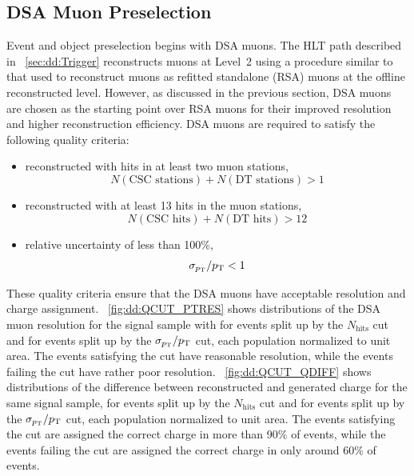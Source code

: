 \subsection{DSA Muon Preselection}
\label{sec:dd:DSAQuality}
Event and object preselection begins with DSA muons.
The HLT path described in \Sec~\ref{sec:dd:Trigger} reconstructs muons at Level~2 using a procedure similar to that used to reconstruct muons as refitted standalone (RSA) muons at the offline reconstructed level.
However, as discussed in the previous section, DSA muons are chosen as the starting point over RSA muons for their improved \pT resolution and higher reconstruction efficiency.
DSA muons are required to satisfy the following quality criteria:
\begin{itemize}
  \item reconstructed with hits in at least two muon stations, \ie $$N(\text{CSC stations}) + N(\text{DT stations}) > 1$$
  \item reconstructed with at least 13 hits in the muon stations, \ie $$N(\text{CSC hits}) + N(\text{DT hits}) > 12$$
  \item relative \pT uncertainty of less than 100\%, \ie $$\sigma_{p_{\mathrm{T}}}/p_{\mathrm{T}} < 1$$
\end{itemize}

These quality criteria ensure that the DSA muons have acceptable \pT resolution and charge assignment.
\Fig~\ref{fig:dd:QCUT_PTRES} shows distributions of the DSA muon \pT resolution for the \twoMu signal sample with  for events split up by the $N_\text{hits}$ cut and for events split up by the $\sigma_{p_{\mathrm{T}}}/p_{\mathrm{T}}$ cut, each population normalized to unit area.
The events satisfying the cut have reasonable \pT resolution, while the events failing the cut have rather poor \pT resolution.
\Fig~\ref{fig:dd:QCUT_QDIFF} shows distributions of the difference between reconstructed and generated charge for the same signal sample, for events split up by the $N_\text{hits}$ cut and for events split up by the $\sigma_{p_{\mathrm{T}}}/p_{\mathrm{T}}$ cut, each population normalized to unit area.
The events satisfying the cut are assigned the correct charge in more than 90\% of events, while the events failing the cut are assigned the correct charge in only around 60\% of events.

